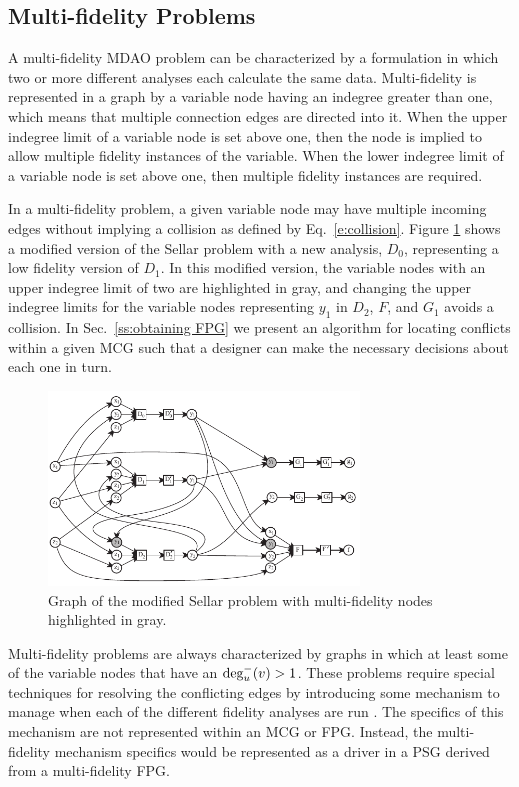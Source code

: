 \subsection{Multi-fidelity Problems}
  \label{ss:multi-fideliy problems}
  A multi-fidelity MDAO problem can be characterized by a formulation in which 
  two or more different analyses each calculate the same data. Multi-fidelity 
  is represented in a graph by a variable node having an indegree greater than 
  one, which means that multiple connection edges are directed into it. When the 
  upper indegree limit of a variable node is set above one, then the node is 
  implied to allow multiple fidelity instances of the variable. When the lower 
  indegree limit of a variable node is set above one, then multiple fidelity instances are required.

  In a multi-fidelity problem, a given variable node may have multiple incoming 
  edges without implying a collision as defined by Eq.~\ref{e:collision}. 
  Figure \ref{f:collision_example} shows a modified version of the Sellar problem 
  with a new analysis, $D_0$, representing a low fidelity version of $D_1$. 
  In this modified version, the variable nodes with an upper indegree limit of two 
  are highlighted in gray, and changing the upper indegree limits for the variable nodes 
  representing $y_1$ in $D_2$, $F$, and $G_1$ avoids a collision. In Sec.~\ref{ss:obtaining FPG} 
  we present an algorithm for locating conflicts within a given MCG such that a designer 
  can make the necessary decisions about each one in turn. 
  \begin{figure}
    \begin{center}
      \includegraphics[width=3.25in]{images/sellar_mulfi}
    \caption{Graph of the modified Sellar problem with multi-fidelity nodes highlighted in gray.\label{f:collision_example}}
  \end{center}
  \end{figure}

  Multi-fidelity problems are always characterized by graphs in which at least some of the variable 
  nodes that have an $\textrm{deg}^-_u(v) > 1$. These problems require 
  special techniques for resolving the conflicting edges by introducing some mechanism
  to manage when each of the different fidelity analyses are 
  run \cite{march2012provably,alexandrov2001approximation,Huang_Allen_Notz_Miller_2006}.
  The specifics of this mechanism are not represented within an MCG or 
  FPG. Instead, the multi-fidelity mechanism specifics would be represented as a 
  driver in a PSG derived from a multi-fidelity FPG. 

